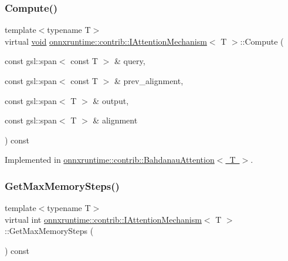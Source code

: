 \subsubsection{\texorpdfstring{Compute()}{Compute()}}
{\footnotesize\ttfamily template$<$typename T$>$ \\
virtual \mbox{\hyperlink{mlasi_8h_a88f941d423cb2a819b70a1358982b1a6}{void}} \mbox{\hyperlink{classonnxruntime_1_1contrib_1_1IAttentionMechanism}{onnxruntime\+::contrib\+::\+I\+Attention\+Mechanism}}$<$ T $>$\+::Compute (\begin{DoxyParamCaption}\item[{const gsl\+::span$<$ const T $>$ \&}]{query,  }\item[{const gsl\+::span$<$ const T $>$ \&}]{prev\+\_\+alignment,  }\item[{const gsl\+::span$<$ T $>$ \&}]{output,  }\item[{const gsl\+::span$<$ T $>$ \&}]{alignment }\end{DoxyParamCaption}) const\hspace{0.3cm}{\ttfamily [pure virtual]}}



Implemented in \mbox{\hyperlink{classonnxruntime_1_1contrib_1_1BahdanauAttention_a6cfed160f597d36d06d3519513ee9295}{onnxruntime\+::contrib\+::\+Bahdanau\+Attention$<$ T $>$}}.

\mbox{\label{classonnxruntime_1_1contrib_1_1IAttentionMechanism_ab39e568cfd98ecbc8403ae4291ff3ab2}} 
\subsubsection{\texorpdfstring{Get\+Max\+Memory\+Steps()}{GetMaxMemorySteps()}}
{\footnotesize\ttfamily template$<$typename T$>$ \\
virtual int \mbox{\hyperlink{classonnxruntime_1_1contrib_1_1IAttentionMechanism}{onnxruntime\+::contrib\+::\+I\+Attention\+Mechanism}}$<$ T $>$\+::Get\+Max\+Memory\+Steps (\begin{DoxyParamCaption}{ }\end{DoxyParamCaption}) const\hspace{0.3cm}{\ttfamily [pure virtual]}}



